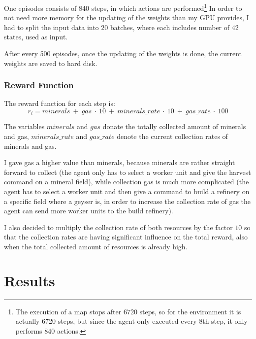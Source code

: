 \documentclass{article}
\begin{document}
One episodes consists of 840 steps, in which actions are performed\footnote{The 
execution of a map stops after 6720 steps, so for the environment it is 
actually 6720 steps, but since the agent only executed every 8th step, it only 
performs 840 actions.} In order to not need more memory for the updating of the 
weights than my GPU provides, I had to split the input data into 20 batches, 
where each includes number of 42 states, used as input.

After every 500 episodes, once the updating of the weights is done, the current 
weights are saved to hard disk.

\subsubsection{Reward Function}
\label{rewards}
The reward function for each step is:
\begin{equation}
r_i = minerals\ +\ gas\ \cdot\ 10\ +\ minerals\_rate\ \cdot\ 10\ +\ gas\_rate\ 
\cdot\ 
100
\end{equation}

The variables $minerals$ and $gas$ donate the totally collected amount of 
minerals and gas, $minerals\_rate$ and $gas\_rate$ denote the current 
collection rates of minerals and gas.

I gave gas a higher value than minerals, because minerals are rather straight 
forward to collect (the agent only has to select a worker unit and give the 
harvest command on a mineral field), while collection gas is much more 
complicated (the agent has to select a worker unit and then give a command to 
build a refinery on a specific field where a geyser is, in order to increase 
the collection rate of gas the agent can send more worker units to the build 
refinery).

I also decided to multiply the collection rate of both resources by the factor 
$10$ so that the collection rates are having significant influence on the total 
reward, also when the total collected amount of resources is already high.

\section{Results}
\end{document}
